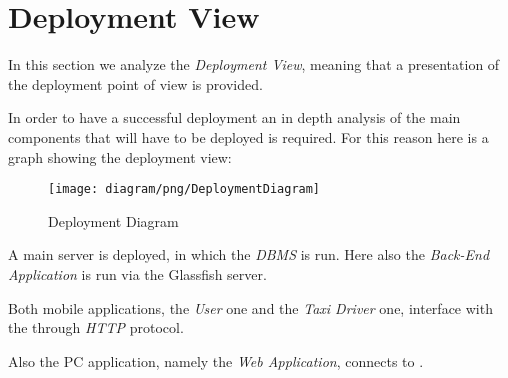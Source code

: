 \newpage

\section{Deployment View} %
\label{sec:deployment_view}

In this section we analyze the \emph{Deployment View}, meaning that a presentation of the deployment point of view is provided.

In order to have a successful deployment an in depth analysis of the main components that will have to be deployed is required.
For this reason here is a graph showing the deployment view:
\begin{figure}[h!t]
\caption{Deployment Diagram}
\texttt{[image: diagram/png/DeploymentDiagram]}
\centering
\end{figure}
\newpage

A main server is deployed, in which the \emph{DBMS} is run. Here also the \emph{Back-End Application} is run via the Glassfish server.

Both mobile applications, the \emph{User} one and the \emph{Taxi Driver} one, interface with the \emph{} through \emph{HTTP} protocol.

Also the PC application, namely the \emph{Web Application}, connects to \emph{}.
